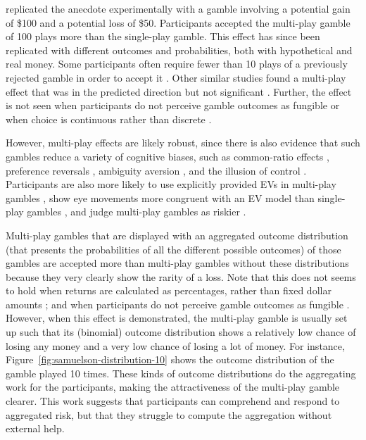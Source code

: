 \documentclass[a4paper, nobind, dvipsnames]{templates/ociamthesis}
\theoremstyle{definition}
\theoremstyle{definition}
\theoremstyle{definition}
\theoremstyle{definition}
\theoremstyle{remark}
\begin{document}
\textcite{wedell1994} replicated the \textcite{samuelson1963} anecdote experimentally with a gamble
involving a potential gain of \$100 and a potential loss of \$50. Participants
accepted the multi-play gamble of 100 plays more than the single-play gamble.
This effect has since been replicated with different outcomes and probabilities,
both with hypothetical and real money. Some participants often require fewer
than 10 plays of a previously rejected gamble in order to accept it \autocite{dekay2005,keren1991,montgomery1982,redelmeier1992}. Other similar studies found a
multi-play effect that was in the predicted direction but not significant
\autocite{barron2003,benartzi1999,klos2005,langer2001}. Further, the effect is not
seen when participants do not perceive gamble outcomes as fungible \autocite{dekay2006,dekay2005,dekay2011} or when choice is continuous rather than discrete
\autocite{bristow2011}.

However, multi-play effects are likely robust, since there is also evidence that
such gambles reduce a variety of cognitive biases, such as common-ratio effects
\autocite{keren1987,keren1991,dekay2006}, preference reversals \autocite{wedell1990},
ambiguity aversion \autocite{liu2009}, and the illusion of control \autocite{koehler1994}.
Participants are also more likely to use explicitly provided EVs in multi-play
gambles \autocite{li2003}, show eye movements more congruent with an EV model than
single-play gambles \autocite{su2013}, and judge multi-play gambles as riskier
\autocite{joag1990}.

Multi-play gambles that are displayed with an aggregated outcome distribution
(that presents the probabilities of all the different possible outcomes) of
those gambles are accepted more than multi-play gambles without these
distributions \autocite{benartzi1999,redelmeier1992,klos2013,webb2017,coombs1971,venkatraman2006,dekay2005,langer2001,keren1991} because they
very clearly show the rarity of a loss. Note that this does not seems to hold
when returns are calculated as percentages, rather than fixed dollar amounts
\autocite{stutzer2013}; and when participants do not perceive gamble outcomes as
fungible \autocite{dekay2005}. However, when this effect is demonstrated, the multi-play
gamble is usually set up such that its (binomial) outcome distribution shows a
relatively low chance of losing any money and a very low chance of losing a lot
of money. For instance, Figure~\ref{fig:samuelson-distribution-10} shows the
outcome distribution of the \textcite{samuelson1963} gamble played 10 times. These kinds
of outcome distributions do the aggregating work for the participants, making
the attractiveness of the multi-play gamble clearer. This work suggests that
participants can comprehend and respond to aggregated risk, but that they
struggle to compute the aggregation without external help.
\end{document}

